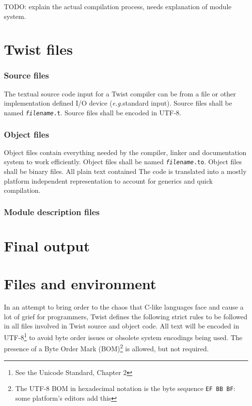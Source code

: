 \documentclass[a4paper,11pt]{report}
\newcommand{\tcode}[1]{\texttt{#1}}
\newcommand{\eg}{\textit{e.g.}}
\begin{document}
TODO: explain the actual compilation process, needs explanation of module system.

\section{Twist files}

\subsubsection{Source files} \label{sec:source_files}

The textual source code input for a Twist compiler can be from a file or other implementation defined I/O device (\eg standard input).
Source files shall be named \tcode{\textit{filename}.t}.
Source files shall be encoded in UTF-8.

\subsubsection{Object files} \label{sec:object_files}

Object files contain everything needed by the compiler, linker and documentation system to work efficiently.
Object files shall be named \tcode{\textit{filename}.to}.
Object files shall be binary files.
All plain text contained
The code is translated into a mostly platform independent representation to account for generics and quick compilation.

\subsubsection{Module description files} \label{sec:module_description_files}


\section{Final output}




\section{Files and environment}

In an attempt to bring order to the chaos that C-like languages face and cause a lot of grief for programmers, Twist defines the following strict rules to be followed in all files involved in Twist source and object code.
All text will be encoded in UTF-8\footnote{See the Unicode Standard, Chapter 2} to avoid byte order issues or obsolete system encodings being used.
The presence of a Byte Order Mark (BOM)\footnote{The UTF-8 BOM in hexadecimal notation is the byte sequence \tcode{EF BB BF}: some platform’s editors add this} is allowed, but not required.
\end{document}
